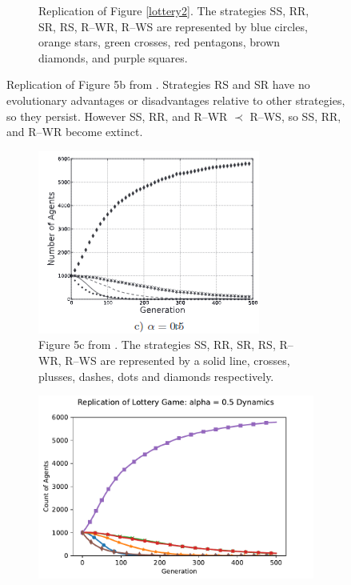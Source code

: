 \begin{figure}[!h]
\begin{subfigure}[b]{0.45\textwidth}
    \caption{Replication of Figure \ref{lottery2}. The strategies SS, RR, SR, RS, R--WR, R--WS are represented by blue circles, orange stars, green crosses, red pentagons, brown diamonds, and purple squares.}
    \label{lottery2_me}
  \end{subfigure}
  \caption{Replication of Figure 5b from \cite{RN30}. Strategies RS and SR have no evolutionary advantages or disadvantages relative to other strategies, so they persist. However SS, RR, and R--WR $\prec$  R--WS, so SS, RR, and R--WR become extinct.} \label{lottery_comp1}
\end{figure} 
\FloatBarrier



\FloatBarrier 
\begin{figure}[!h]
  \begin{subfigure}[b]{0.45\textwidth}
    \includegraphics[width=\textwidth]{images/lottery3.png}
    \caption{Figure 5c from \cite{RN30}. The strategies SS, RR, SR, RS, R--WR, R--WS are represented by a solid line, crosses, plusses, dashes, dots and diamonds respectively. }
    \label{lottery3}
  \end{subfigure}
  \hfill
  \begin{subfigure}[b]{0.45\textwidth}
    \includegraphics[width=1.25\textwidth]{images/lottery3_me.pdf}

\end{subfigure}
\end{figure}
